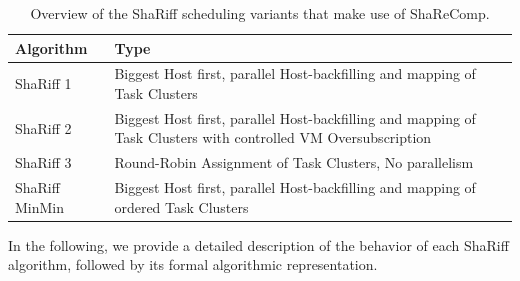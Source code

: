 \begin{table}[H]
    \centering
    \footnotesize
    \begin{tabularx}{\textwidth}{l p{10cm}}
        \toprule
        \textbf{Algorithm} & \textbf{Type}                                                                                                  \\
        \midrule
        ShaRiff 1          & Biggest Host first, parallel Host-backfilling and mapping of Task Clusters                                     \\
        ShaRiff 2          & Biggest Host first, parallel Host-backfilling and mapping of Task Clusters with controlled VM Oversubscription \\
        ShaRiff 3          & Round-Robin Assignment of Task Clusters, No parallelism                                                        \\
        ShaRiff MinMin     & Biggest Host first, parallel Host-backfilling and mapping of ordered Task Clusters                             \\
        \bottomrule
    \end{tabularx}
    \small
    \caption{Overview of the ShaRiff scheduling variants that make use of ShaReComp.}
    \label{tab:shariff_overview}
\end{table}


In the following, we provide a detailed description of the behavior of each ShaRiff algorithm, followed by its formal algorithmic representation.

